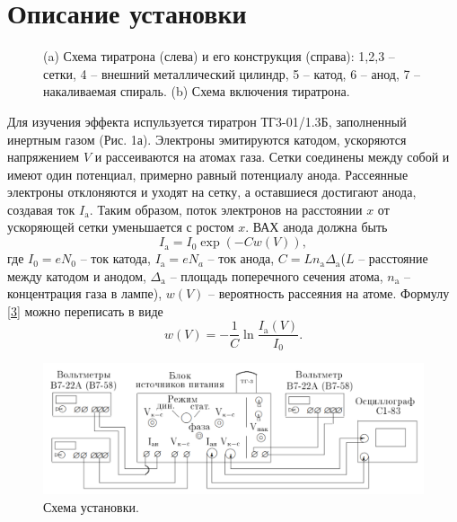 \documentclass[a4paper,12pt]{article}
\begin{document}
\section*{Описание установки}
\begin{figure}[h]
  \centering
  \caption{(a) Схема тиратрона (слева) и его конструкция (справа): 1,2,3 -- сетки, 4 -- внешний металлический цилиндр, 5 -- катод, 6 -- анод, 7 -- накаливаемая спираль. (b) Схема включения тиратрона.}
\end{figure}
Для изучения эффекта испульзуется тиратрон ТГ3-01/1.3Б, заполненный инертным газом (Рис. 1а). Электроны эмитируются катодом, ускоряются напряжением $V$ и рассеиваются на атомах газа. Сетки соединены между собой и имеют один потенциал, примерно равный потенциалу анода. Рассеянные электроны отклоняются и уходят на сетку, а оставшиеся достигают анода, создавая ток $I_\text{a}$. Таким образом, поток электронов на расстоянии $x$ от ускоряющей сетки уменьшается с ростом $x$. ВАХ анода должна быть
\begin{equation}\label{3}
I_\text{a} = I_0 \exp\left( - C w(V) \right),
\end{equation}
где $I_0 = eN_0$ -- ток катода, $I_\text{a} = eN_a$ -- ток анода, $C = Ln_\text{a} \Delta_\text{a}$($L$ --  расстояние между катодом и анодом, $\Delta_\text{a}$ -- площадь поперечного сечения атома, $n_\text{a}$ -- концентрация газа в лампе), $w(V)$ -- вероятность рассеяния на атоме.
Формулу \eqref{3} можно переписать в виде
\[\tag{5a}\label{5a}
w(V) = -\dfrac{1}{C}\ln \dfrac{I_\text{a}(V)}{I_0}.
\]
\begin{figure}[h]
\includegraphics[scale=0.6]{1.png}
\centering
\caption{Схема установки.}
\end{figure}\\
\end{document}
